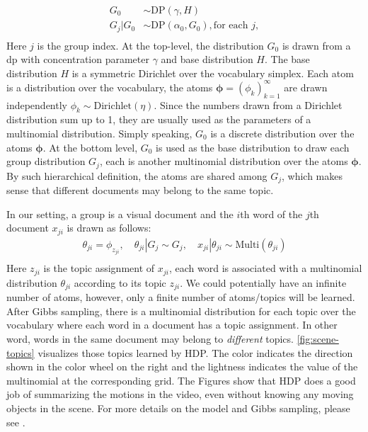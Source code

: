 \begin{equation}    \label{eq:hdp}
\begin{aligned}    
    G_0 & \sim \text{DP}(\gamma, H) \\
    G_j|G_0 & \sim \text{DP}(\alpha_0, G_0), \text{for each } j,\\
\end{aligned}
\end{equation}
Here $j$ is the group index. At the top-level, the distribution $G_0$ is drawn from a \gls{dp} with concentration parameter $\gamma$ and base distribution $H$. 
The base distribution $H$ is a symmetric Dirichlet over the vocabulary simplex. 
Each atom is a distribution over the vocabulary, the atoms $\bm{\phi}=(\phi_k)^{\infty}_{k=1}$ are drawn independently $\phi_k \sim\text{Dirichlet}(\eta)$. Since the numbers drawn from a Dirichlet distribution sum up to 1, they are usually used as the parameters of a multinomial distribution. 
Simply speaking, $G_0$ is a discrete distribution over the atoms $\bm{\phi}$. 
At the bottom level, $G_0$ is used as the base distribution to draw each group distribution $G_j$, each is another multinomial distribution over the atoms $\bm{\phi}$. 
By such hierarchical definition, the atoms are shared among $G_j$, which makes sense that different documents may belong to the same topic.

In our setting, a group is a visual document and the $i$th word of the $j$th document $x_{ji}$ is drawn as follows:
\begin{equation}    \label{eq:multinomial}
\begin{aligned}
    \theta_{ji} = \phi_{z_{ji}}, \quad \theta_{ji}|G_j \sim G_j, \quad
    x_{ji}|\theta_{ji} \sim \text{Multi}(\theta_{ji})\\
\end{aligned}
\end{equation}
Here $z_{ji}$ is the topic assignment of $x_{ji}$, each word is associated with a multinomial distribution $\theta_{ji}$ according to its topic $z_{ji}$. 
We could potentially have an infinite number of atoms, however, only a finite number of atoms/topics will be learned. 
After Gibbs sampling, there is a multinomial distribution for each topic over the vocabulary where each word in a document has a topic assignment. 
In other word, words in the same document may belong to  \emph{different} topics. \ref{fig:scene-topics} visualizes those topics learned by HDP. 
The color indicates the direction shown in the color wheel on the right and the lightness indicates the value of the multinomial at the corresponding grid. 
The Figures show that HDP does a good job of summarizing the motions in the video, even without knowing any moving objects in the scene. 
For more details on the model and Gibbs sampling, please see \cite{yee2006hierarchical}. 

